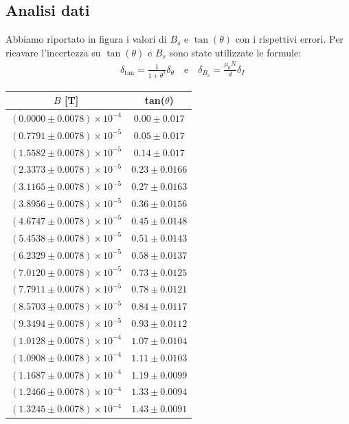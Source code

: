 \documentclass[a4paper]{article}
\begin{document}
\subsection{Analisi dati}
Abbiamo riportato in figura i valori di $B_s$ e $\tan(\theta)$ con i rispettivi errori.
Per ricavare l'incertezza su $\tan(\theta)$ e $B_s$ sono state utilizzate le formule:
\begin{align*}
	 & \delta_{\tan} = \frac {1}{1+\theta^2}\delta_\theta \quad \text{e} \quad \delta_{B_s} = \frac {\mu_0N}{d}\delta_I
\end{align*}

\begin{center}
\begin{tabular}{|c|c|}
\hline
$B$ [T] & tan($\theta$) \\
\hline
$(0.0000 \pm 0.0078) \times 10^{-4}$ & $0.00 \pm 0.017$ \\
$(0.7791 \pm 0.0078) \times 10^{-5}$ & $0.05 \pm 0.017$ \\
$(1.5582 \pm 0.0078) \times 10^{-5}$ & $0.14 \pm 0.017$ \\
$(2.3373 \pm 0.0078) \times 10^{-5}$ & $0.23 \pm 0.0166$ \\
$(3.1165 \pm 0.0078) \times 10^{-5}$ & $0.27 \pm 0.0163$ \\
$(3.8956 \pm 0.0078) \times 10^{-5}$ & $0.36 \pm 0.0156$ \\
$(4.6747 \pm 0.0078) \times 10^{-5}$ & $0.45 \pm 0.0148$ \\
$(5.4538 \pm 0.0078) \times 10^{-5}$ & $0.51 \pm 0.0143$ \\
$(6.2329 \pm 0.0078) \times 10^{-5}$ & $0.58 \pm 0.0137$ \\
$(7.0120 \pm 0.0078) \times 10^{-5}$ & $0.73 \pm 0.0125$ \\
$(7.7911 \pm 0.0078) \times 10^{-5}$ & $0.78 \pm 0.0121$ \\
$(8.5703 \pm 0.0078) \times 10^{-5}$ & $0.84 \pm 0.0117$ \\
$(9.3494 \pm 0.0078) \times 10^{-5}$ & $0.93 \pm 0.0112$ \\
$(1.0128 \pm 0.0078) \times 10^{-4}$ & $1.07 \pm 0.0104$ \\
$(1.0908 \pm 0.0078) \times 10^{-4}$ & $1.11 \pm 0.0103$ \\
$(1.1687 \pm 0.0078) \times 10^{-4}$ & $1.19 \pm 0.0099$ \\
$(1.2466 \pm 0.0078) \times 10^{-4}$ & $1.33 \pm 0.0094$ \\
$(1.3245 \pm 0.0078) \times 10^{-4}$ & $1.43 \pm 0.0091$ \\

\end{tabular}
\end{center}
\end{document}
